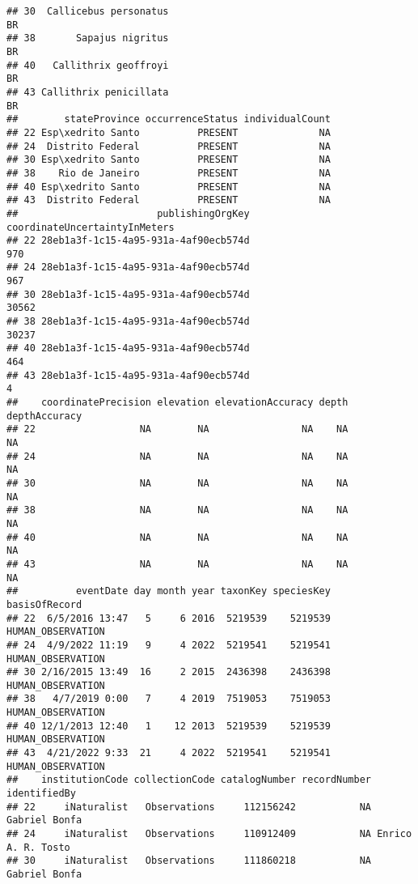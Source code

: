 \documentclass[
]{book}
\begin{document}
\begin{verbatim}
## 30  Callicebus personatus                                           BR         
## 38       Sapajus nigritus                                           BR         
## 40   Callithrix geoffroyi                                           BR         
## 43 Callithrix penicillata                                           BR         
##        stateProvince occurrenceStatus individualCount
## 22 Esp\xedrito Santo          PRESENT              NA
## 24  Distrito Federal          PRESENT              NA
## 30 Esp\xedrito Santo          PRESENT              NA
## 38    Rio de Janeiro          PRESENT              NA
## 40 Esp\xedrito Santo          PRESENT              NA
## 43  Distrito Federal          PRESENT              NA
##                        publishingOrgKey coordinateUncertaintyInMeters
## 22 28eb1a3f-1c15-4a95-931a-4af90ecb574d                           970
## 24 28eb1a3f-1c15-4a95-931a-4af90ecb574d                           967
## 30 28eb1a3f-1c15-4a95-931a-4af90ecb574d                         30562
## 38 28eb1a3f-1c15-4a95-931a-4af90ecb574d                         30237
## 40 28eb1a3f-1c15-4a95-931a-4af90ecb574d                           464
## 43 28eb1a3f-1c15-4a95-931a-4af90ecb574d                             4
##    coordinatePrecision elevation elevationAccuracy depth depthAccuracy
## 22                  NA        NA                NA    NA            NA
## 24                  NA        NA                NA    NA            NA
## 30                  NA        NA                NA    NA            NA
## 38                  NA        NA                NA    NA            NA
## 40                  NA        NA                NA    NA            NA
## 43                  NA        NA                NA    NA            NA
##          eventDate day month year taxonKey speciesKey     basisOfRecord
## 22  6/5/2016 13:47   5     6 2016  5219539    5219539 HUMAN_OBSERVATION
## 24  4/9/2022 11:19   9     4 2022  5219541    5219541 HUMAN_OBSERVATION
## 30 2/16/2015 13:49  16     2 2015  2436398    2436398 HUMAN_OBSERVATION
## 38   4/7/2019 0:00   7     4 2019  7519053    7519053 HUMAN_OBSERVATION
## 40 12/1/2013 12:40   1    12 2013  5219539    5219539 HUMAN_OBSERVATION
## 43  4/21/2022 9:33  21     4 2022  5219541    5219541 HUMAN_OBSERVATION
##    institutionCode collectionCode catalogNumber recordNumber       identifiedBy
## 22     iNaturalist   Observations     112156242           NA      Gabriel Bonfa
## 24     iNaturalist   Observations     110912409           NA Enrico A. R. Tosto
## 30     iNaturalist   Observations     111860218           NA      Gabriel Bonfa

\end{verbatim}
\end{document}
